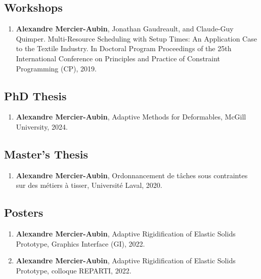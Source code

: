 \documentclass[10pt]{article} %
\begin{document}
\subsection{Workshops}
\begin{enumerate}
  \setcounter{enumi}{\value{listCounter}}
  \item \textbf{Alexandre Mercier-Aubin}, Jonathan Gaudreault, and Claude-Guy Quimper. Multi-Resource Scheduling with Setup Times:
An Application Case to the Textile Industry. In Doctoral Program Proceedings of the 25th International
Conference on Principles and Practice of Constraint Programming (CP), 2019. 

\end{enumerate}

\subsection{PhD Thesis}
\begin{enumerate}
  \setcounter{enumi}{\value{listCounter}}
  \item \textbf{Alexandre Mercier-Aubin}, Adaptive Methods for Deformables, McGill University, 2024. 
\end{enumerate}

\subsection{Master's Thesis}
\begin{enumerate}
  \setcounter{enumi}{\value{listCounter}}
  \item \textbf{Alexandre Mercier-Aubin}, Ordonnancement de tâches sous contraintes sur des métiers à tisser, Université Laval, 2020. 
\end{enumerate}


\subsection{Posters}
\begin{enumerate}
  \setcounter{enumi}{\value{listCounter}}
  \item \textbf{Alexandre Mercier-Aubin}, Adaptive Rigidification of Elastic Solids Prototype, Graphics Interface (GI), 2022. 
  \item \textbf{Alexandre Mercier-Aubin}, Adaptive Rigidification of Elastic Solids Prototype, colloque REPARTI, 2022. 
\end{enumerate}
\end{document}
